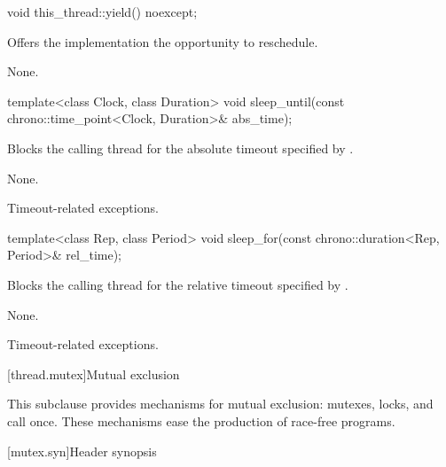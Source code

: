 %
\begin{itemdecl}
void this_thread::yield() noexcept;
\end{itemdecl}

\begin{itemdescr}
\pnum
\effects
Offers the implementation the opportunity to reschedule.

\pnum
\sync
None.
\end{itemdescr}

%
\begin{itemdecl}
template<class Clock, class Duration>
  void sleep_until(const chrono::time_point<Clock, Duration>& abs_time);
\end{itemdecl}

\begin{itemdescr}
\pnum
\effects
Blocks the calling thread for the absolute timeout specified
by .

\pnum
\sync
None.

\pnum
\throws
Timeout-related exceptions.
\end{itemdescr}

%
\begin{itemdecl}
template<class Rep, class Period>
  void sleep_for(const chrono::duration<Rep, Period>& rel_time);
\end{itemdecl}

\begin{itemdescr}
\pnum
\effects
Blocks the calling thread for the relative timeout specified
by .

\pnum
\sync
None.

\pnum
\throws
Timeout-related exceptions.
\end{itemdescr}

[thread.mutex]{Mutual exclusion}

\pnum
This subclause provides mechanisms for mutual exclusion: mutexes, locks, and call
once. These mechanisms ease the production of race-free
programs.

[mutex.syn]{Header  synopsis}

